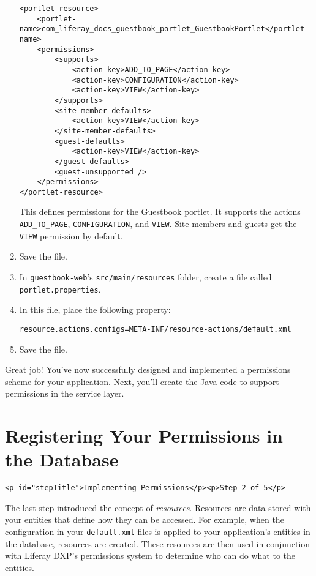 \begin{enumerate}
\begin{verbatim}
<portlet-resource>
    <portlet-name>com_liferay_docs_guestbook_portlet_GuestbookPortlet</portlet-name>
    <permissions>
        <supports>
            <action-key>ADD_TO_PAGE</action-key>
            <action-key>CONFIGURATION</action-key>
            <action-key>VIEW</action-key>
        </supports>
        <site-member-defaults>
            <action-key>VIEW</action-key>
        </site-member-defaults>
        <guest-defaults>
            <action-key>VIEW</action-key>
        </guest-defaults>
        <guest-unsupported />
    </permissions>
</portlet-resource>
\end{verbatim}

  This defines permissions for the Guestbook portlet. It supports the
  actions \texttt{ADD\_TO\_PAGE}, \texttt{CONFIGURATION}, and
  \texttt{VIEW}. Site members and guests get the \texttt{VIEW}
  permission by default.
\item
  Save the file.
\item
  In \texttt{guestbook-web}'s \texttt{src/main/resources} folder, create
  a file called \texttt{portlet.properties}.
\item
  In this file, place the following property:

\begin{verbatim}
resource.actions.configs=META-INF/resource-actions/default.xml
\end{verbatim}
\item
  Save the file.
\end{enumerate}

Great job! You've now successfully designed and implemented a
permissions scheme for your application. Next, you'll create the Java
code to support permissions in the service layer.

\chapter{Registering Your Permissions in the
Database}\label{registering-your-permissions-in-the-database}

\begin{verbatim}
<p id="stepTitle">Implementing Permissions</p><p>Step 2 of 5</p>
\end{verbatim}

The last step introduced the concept of \emph{resources}. Resources are
data stored with your entities that define how they can be accessed. For
example, when the configuration in your \texttt{default.xml} files is
applied to your application's entities in the database, resources are
created. These resources are then used in conjunction with Liferay DXP's
permissions system to determine who can do what to the entities.

